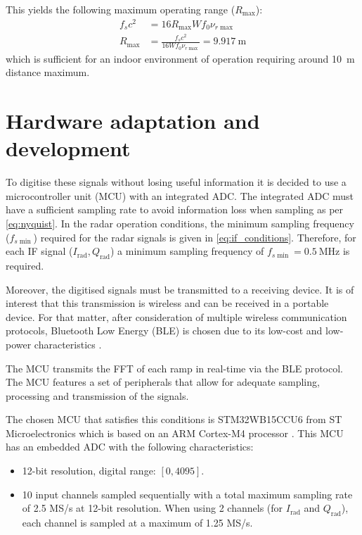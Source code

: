 This yields the following maximum operating range ($R_{\max}$):
\begin{align}
	f_s c^2 &= 16 R_{\max}W f_0 \nu_{r\max} \\
	R_{\max} &= \frac{f_s c^2}{16 W f_0 \nu_{r\max}} = \SI{9.917}{\meter}
\end{align}
which is sufficient for an indoor environment of operation requiring around \SI{10}{\meter} distance maximum.

\section{Hardware adaptation and development}
To digitise these signals without losing useful information it is decided to use a microcontroller unit (MCU) with an integrated ADC. The integrated ADC must have a sufficient sampling rate to avoid information loss when sampling as per \cref{eq:nyquist}. In the radar operation conditions, the minimum sampling frequency ($f_{s\min}$) required for the radar signals is given in \cref{eq:if_conditions}. Therefore, for each IF signal ($I_\mathrm{rad}, Q_\mathrm{rad}$) a minimum sampling frequency of $f_{s\min} = \SI{0.5}{\mega\hertz}$ is required.

Moreover, the digitised signals must be transmitted to a receiving device. It is of interest that this transmission is wireless and can be received in a portable device. For that matter, after consideration of multiple wireless communication protocols, Bluetooth Low Energy (BLE) is chosen due to its low-cost and low-power characteristics \cite{Gomez2012}.

The MCU transmits the FFT of each ramp in real-time via the BLE protocol. The MCU features a set of peripherals that allow for adequate sampling, processing and transmission of the signals. 

The chosen MCU that satisfies this conditions is STM32WB15CCU6 from ST Microelectronics which is based on an ARM Cortex-M4 processor \cite{STMicroelectronics2022}. This MCU has an embedded ADC with the following characteristics:
\begin{itemize}
	\item 12-bit resolution, digital range: $[0, 4095]$.
	\item 10 input channels sampled sequentially with a total maximum sampling rate of 2.5 MS/s at 12-bit resolution. When using 2 channels (for $I_\mathrm{rad}$ and $Q_\mathrm{rad}$), each channel is sampled at a maximum of 1.25 MS/s.
\end{itemize}


